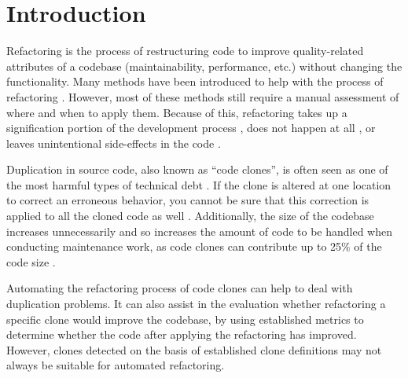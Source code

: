 \chapter{Introduction}
\label{ch:introduction}
Refactoring is the process of restructuring code to improve quality-related attributes of a codebase (maintainability, performance, etc.) without changing the functionality. Many methods have been introduced to help with the process of refactoring \cite{fowler2018refactoring, wake2004refactoring}. However, most of these methods still require a manual assessment of where and when to apply them. Because of this, refactoring takes up a signification portion of the development process \cite{lientz1978characteristics, mens2004survey}, does not happen at all \cite{mens2003refactoring}, or leaves unintentional side-effects in the code \cite{bavota2012does}. %

Duplication in source code, also known as ``code clones'', is often seen as one of the most harmful types of technical debt \cite{fowler1999refactoring}. If the clone is altered at one location to correct an erroneous behavior, you cannot be sure that this correction is applied to all the cloned code as well \cite{ostberg2014automatically}. Additionally, the size of the codebase increases unnecessarily and so increases the amount of code to be handled when conducting maintenance work, as code clones can contribute up to 25\% of the code size \cite{bruntink2005use}.

Automating the refactoring process of code clones can help to deal with duplication problems. It can also assist in the evaluation whether refactoring a specific clone would improve the codebase, by using established metrics \cite{heitlager2007practical} to determine whether the code after applying the refactoring has improved. However, clones detected on the basis of established clone definitions \cite{roy2007survey} may not always be suitable for automated refactoring.

